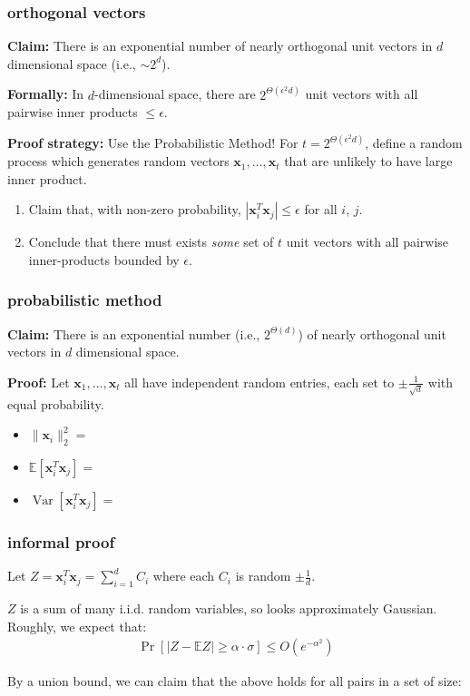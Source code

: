 \documentclass[compress]{beamer}
\newcommand{\bv}[1]{\mathbf{#1}}
\newcommand{\E}{\mathbb{E}}
\DeclareMathOperator{\Var}{Var}
\begin{document}
\begin{frame}[t]
	\frametitle{orthogonal vectors}
		\textbf{Claim:} There is an exponential number of nearly orthogonal unit vectors in $d$ dimensional space  (i.e., $\sim 2^d$).

		\textbf{Formally:} In $d$-dimensional space, there are $2^{\Theta(\epsilon^2 d)}$ unit vectors with all pairwise inner products $\leq \epsilon$. 
		
		\textbf{Proof strategy:} Use the \alert{Probabilistic Method}! For $t =  2^{\Theta(\epsilon^2 d)}$, define a random process which generates random vectors $\bv{x}_1, \ldots, \bv{x}_t$ that are unlikely to have large inner product.
		\begin{enumerate}
			\item Claim that, with non-zero probability, $|\bv{x}_i^T\bv{x}_j| \leq \epsilon$ for all $i$, $j$.
			
			\item Conclude that there must exists \emph{some} set of $t$ unit vectors with all pairwise inner-products  bounded by $\epsilon$. 
		\end{enumerate}
\end{frame}


\begin{frame}[t]
	\frametitle{probabilistic method}
	\textbf{Claim:} There is an exponential number (i.e., $ 2^{\Theta(d)}$) of nearly orthogonal unit vectors in $d$ dimensional space.
	
	\textbf{Proof:} Let $\bv{x}_1, \ldots, \bv{x}_t$ all have independent random entries, each set to $\pm \frac{1}{\sqrt{d}}$ with equal probability. 
	\begin{itemize}
		\item $\|\bv{x}_i\|_2^2 = $
		\vspace{2em}
		\item $\E[\bv{x}_i^T\bv{x}_j]=$
		\vspace{2em}
		\item $\Var[\bv{x}_i^T\bv{x}_j]=$
	\end{itemize}
\end{frame}

\begin{frame}[t]
	\frametitle{informal proof}
	Let $Z = \bv{x}_i^T\bv{x}_j = \sum_{i=1}^d C_i$ where each $C_i$ is random $\pm \frac{1}{d}$.
	
	
	$Z$ is a sum of many i.i.d. random variables, so looks approximately Gaussian. Roughly, we expect that:
	\begin{align*}
		\Pr[|Z - \E Z| \geq \alpha\cdot \sigma] \leq O(e^{-\alpha^2})
	\end{align*}
\vspace{8em}

By a union bound, we can claim that the above holds for all pairs in a set of size:
\end{frame}
\end{document}
